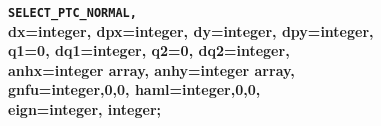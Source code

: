\begin{description}
   \item[Commands] 

   \item {\texttt{\textbf{\textbf{SELECT\_PTC\_NORMAL, }}}\\
     \textbf{\textbf{dx}=integer\textbf{, dpx}=integer\textbf{, dy}=integer\textbf{, dpy}=integer\textbf{,\\
         q1}=0\textbf{, dq1}=integer\textbf{, q2}=0\textbf{, dq2}=integer\textbf{,         
         \\ anhx}=integer array, \textbf{anhy}=integer array\textbf{, 
         \\ gnfu}=integer,0,0\textbf{, haml}=integer,0,0\textbf{,
         \\ eign}=integer, integer\textbf{;}}}
     

\end{description}
